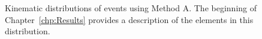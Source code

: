 \begin{figure}[h!]
\centering
{}
\caption{Kinematic distributions of \photwojet events using Method A. The beginning of Chapter~\ref{chp:Results} provides a description of the elements in this distribution.}
\label{fig:pjSetFour}
\end{figure}
\clearpage


